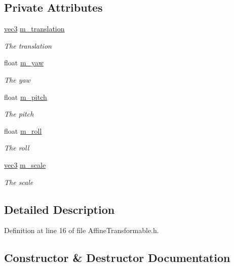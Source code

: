 \subsection*{Private Attributes}
\begin{DoxyCompactItemize}
\item 
\hyperlink{_types_8h_a3d0ce73e3199de81565fb01632415288}{vec3} \hyperlink{class_affine_transformable_a3573983127e380c3d9151c32b43d199d}{m\+\_\+translation}
\begin{DoxyCompactList}\small\item\em The translation \end{DoxyCompactList}\item 
float \hyperlink{class_affine_transformable_abf9b231dc1bd3e61bbbed8714f127f93}{m\+\_\+yaw}
\begin{DoxyCompactList}\small\item\em The yaw \end{DoxyCompactList}\item 
float \hyperlink{class_affine_transformable_ade24cef424ce102502357cde8214d54b}{m\+\_\+pitch}
\begin{DoxyCompactList}\small\item\em The pitch \end{DoxyCompactList}\item 
float \hyperlink{class_affine_transformable_a33e3fc9a32cafaa0a04c6058f283d437}{m\+\_\+roll}
\begin{DoxyCompactList}\small\item\em The roll \end{DoxyCompactList}\item 
\hyperlink{_types_8h_a3d0ce73e3199de81565fb01632415288}{vec3} \hyperlink{class_affine_transformable_ac332af15336f089337fd31d7b3996bad}{m\+\_\+scale}
\begin{DoxyCompactList}\small\item\em The scale \end{DoxyCompactList}\end{DoxyCompactItemize}


\subsection{Detailed Description}


Definition at line 16 of file Affine\+Transformable.\+h.



\subsection{Constructor \& Destructor Documentation}
